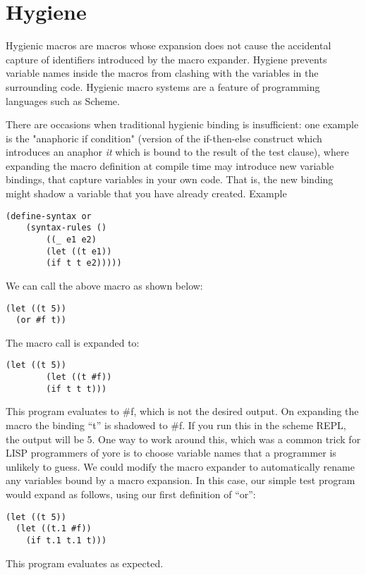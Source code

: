 \section{Hygiene}

Hygienic macros are macros whose expansion does not cause the accidental capture of identifiers introduced by the macro expander. Hygiene prevents variable names inside the macros from clashing with the variables in the surrounding code. Hygienic macro systems are a feature of programming languages such as Scheme. 

There are occasions when traditional hygienic binding is insufficient: one example is the "anaphoric if condition" (version of the if-then-else construct which introduces an anaphor \textit{it} which is bound to the result of the test clause), where expanding the macro definition at compile time may introduce new variable bindings, that capture variables in your own code. That is, the new binding might shadow a variable that you have already created. Example
\begin{lstlisting}[frame=single]
(define-syntax or
  	(syntax-rules ()
    	((_ e1 e2)
     	(let ((t e1))
       	(if t t e2)))))
\end{lstlisting}
We can call the above macro as shown below:
\begin{lstlisting}[frame=single]
(let ((t 5))
  (or #f t))
\end{lstlisting} 
The macro call is expanded to:
\begin{lstlisting}[frame=single]
(let ((t 5))
  		(let ((t #f))
    	(if t t t)))
\end{lstlisting} 
 This program evaluates to \#f, which is not the desired output. On expanding the macro the binding ``t'' is shadowed to \#f. If you run this in the scheme REPL, the output will be 5. One way to work around this, which was a common trick for LISP programmers of yore is to choose variable names that a programmer is unlikely to guess. We could modify the macro expander to automatically rename any variables bound by a macro expansion. In this case, our simple test program would expand as follows, using our first definition of ``or'':

\begin{lstlisting}[frame=single] 
(let ((t 5))
  (let ((t.1 #f))
    (if t.1 t.1 t)))
\end{lstlisting}   
This program evaluates as expected.

